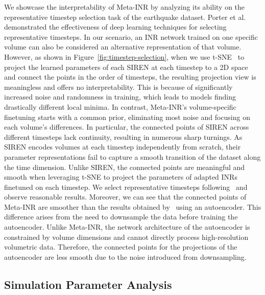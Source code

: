 We showcase the interpretability of Meta-INR by analyzing its ability on the representative timestep selection task of the earthquake dataset. 
Porter et al.\ \cite{Porter-VISSP19} demonstrated the effectiveness of deep learning techniques for selecting representative timesteps.
In our scenario, an INR network trained on one specific volume can also be considered an alternative representation of that volume.
However, as shown in Figure~\ref{fig:timestep-selection}, when we use t-SNE~\cite{t-SNE} to project the learned parameters of each SIREN at each timestep to a 2D space and connect the points in the order of timesteps, the resulting projection view is meaningless and offers no interpretability. 
This is because of significantly increased noise and randomness in training, which leads to models finding drastically different local minima. In contrast, Meta-INR's volume-specific finetuning starts with a common prior, eliminating most noise and focusing on each volume's differences.
In particular, the connected points of SIREN across different timesteps lack continuity, resulting in numerous sharp turnings. 
As SIREN encodes volumes at each timestep independently from scratch, their parameter representations fail to capture a smooth transition of the dataset along the time dimension.
%
Unlike SIREN, the connected points are meaningful and smooth when leveraging t-SNE to project the parameters of adapted INRs finetuned on each timestep.
We select representative timesteps following~\cite{Porter-VISSP19} and observe reasonable results.
Moreover, we can see that the connected points of Meta-INR are smoother than the results obtained by~\cite{Porter-VISSP19} using an autoencoder.
This difference arises from the need to downsample the data before training the autoencoder. 
Unlike Meta-INR, the network architecture of the autoencoder is constrained by volume dimensions and cannot directly process high-resolution volumetric data.
Therefore, the connected points for the projections of the autoencoder are less smooth due to the noise introduced from downsampling.

\vspace{-0.05in}
\subsection{Simulation Parameter Analysis}
\label{subsec:spa}

